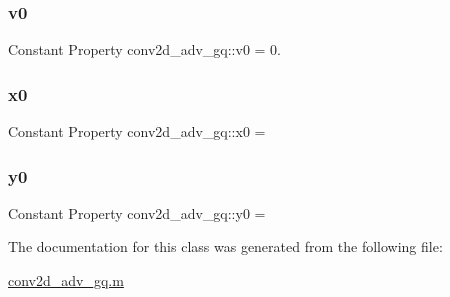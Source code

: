 \subsubsection{\texorpdfstring{v0}{v0}}
{\footnotesize\ttfamily Constant Property conv2d\+\_\+adv\+\_\+gq\+::v0 = 0.}

\mbox{\label{classconv2d__adv__gq_a7308924ffc2c42069e7b02b849f69748}} 
\subsubsection{\texorpdfstring{x0}{x0}}
{\footnotesize\ttfamily Constant Property conv2d\+\_\+adv\+\_\+gq\+::x0 =}

\mbox{\label{classconv2d__adv__gq_aeac30ee616feaa885cd2c3d55998d00d}} 
\subsubsection{\texorpdfstring{y0}{y0}}
{\footnotesize\ttfamily Constant Property conv2d\+\_\+adv\+\_\+gq\+::y0 =}



The documentation for this class was generated from the following file\+:\begin{DoxyCompactItemize}
\item 
\hyperlink{conv2d__adv__gq_8m}{conv2d\+\_\+adv\+\_\+gq.\+m}\end{DoxyCompactItemize}
